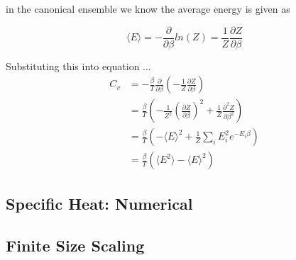 \documentclass[a4paper,11pt]{article}
\begin{document}
        in the canonical ensemble we know the average energy is given as 

        \begin{equation}
        \langle E \rangle = - \frac{\partial}{\partial\beta}ln(Z) =\frac{1}{Z}\frac{\partial Z}{\partial \beta}
        \end{equation}

        Substituting this into equation ... 
        \begin{equation}
        \begin{split}
            C_v &= -\frac{\beta}{T}\frac{\partial}{\partial\beta}(-\frac{1}{Z}\frac{\partial Z}{\partial \beta})\\
                &= \frac{\beta}{T}(-\frac{1}{Z^2}(\frac{\partial Z}{\partial \beta})^2 +\frac{1}{Z}\frac{\partial^2 Z}{\partial \beta^2})\\
                &= \frac{\beta}{T}(-\langle E \rangle^2 +\frac{1}{Z}\sum_i E_i^2 e^{-E_i \beta})\\
                &= \frac{\beta}{T}(\langle E^2 \rangle - \langle E \rangle^2)
        \end{split}
        \end{equation}

        

    \subsection{Specific Heat: Numerical}

    \subsection{Finite Size Scaling}
\end{document}
